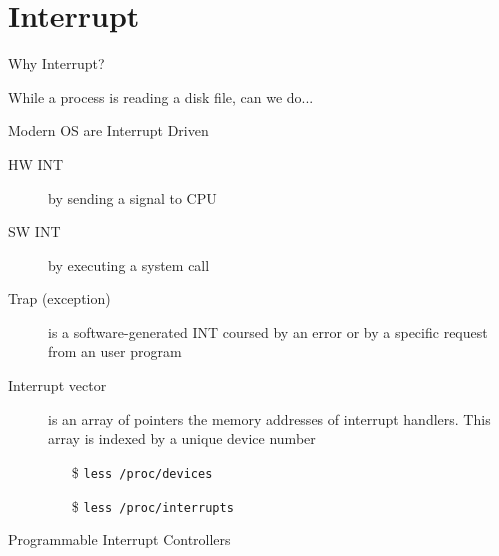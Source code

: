 \section{Interrupt}
\label{sec:interrupt}


\begin{frame}{Why Interrupt?}
  \begin{block}{While a process is reading a disk file, can we do...}
    \begin{center}
    \end{center}
  \end{block}
\end{frame}

\begin{frame}{Modern OS are Interrupt Driven}
  \begin{description}
  \item[HW INT] by sending a signal to CPU
  \item[SW INT] by executing a \alert{system call}
  \item[Trap (exception)] is a software-generated INT coursed by an error or by a
    specific request from an user program
  \item[Interrupt vector] is an array of pointers {\pright} the memory addresses
    of \alert{interrupt handlers}. This array is indexed by a unique device number
    \begin{itemize}
    \item[\$] \texttt{less /proc/devices}
    \item[\$] \texttt{less /proc/interrupts}
    \end{itemize}
  \end{description}
\end{frame}

\begin{frame}{Programmable Interrupt Controllers}
  \begin{center}
  \end{center}
\end{frame}


